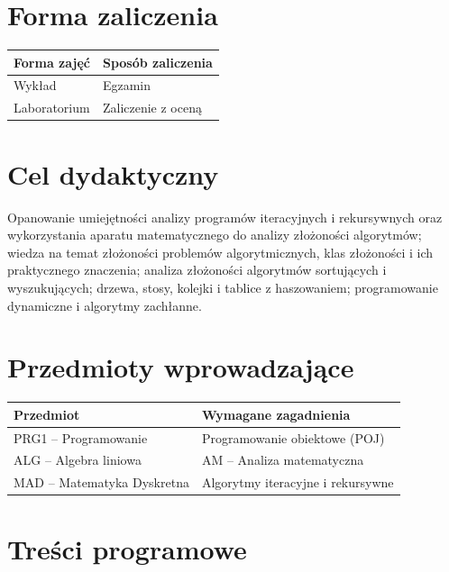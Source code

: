 \documentclass[12pt, a4paper]{article}
\begin{document}
\section{Forma zaliczenia}

\begin{tabular}{ll}
  \toprule
  \textbf{Forma zajęć} & \textbf{Sposób zaliczenia} \\
  \midrule
  Wykład      & Egzamin \\
  Laboratorium & Zaliczenie z oceną \\
  \bottomrule
\end{tabular}

\section{Cel dydaktyczny}

Opanowanie umiejętności analizy programów iteracyjnych i rekursywnych oraz
wykorzystania aparatu matematycznego do analizy złożoności algorytmów; wiedza
na temat złożoności problemów algorytmicznych, klas złożoności i ich praktycznego
znaczenia; analiza złożoności algorytmów sortujących i wyszukujących; drzewa,
stosy, kolejki i tablice z haszowaniem; programowanie dynamiczne i algorytmy
zachłanne.

\section{Przedmioty wprowadzające}

\begin{tabularx}{\textwidth}{lX}
  \toprule
  \textbf{Przedmiot} & \textbf{Wymagane zagadnienia} \\
  \midrule
  PRG1 -- Programowanie           & Programowanie obiektowe (POJ) \\
  ALG -- Algebra liniowa          & AM -- Analiza matematyczna \\
  MAD -- Matematyka Dyskretna     & Algorytmy iteracyjne i rekursywne \\
  \bottomrule
\end{tabularx}

\section{Treści programowe}
\end{document}
